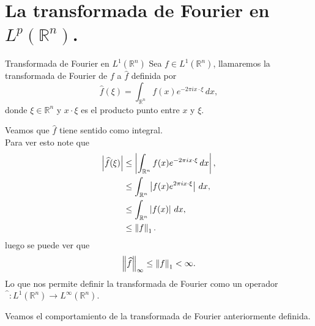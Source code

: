 \section{La transformada de Fourier en $L^{p}(\mathbb{R}^{n})$.}
  \begin{definition}{Transformada de Fourier en $L^{1}(\mathbb{R}^{n})$}
    Sea $f\in L^{1}(\mathbb{R}^{n})$, llamaremos la transformada de Fourier de $f$ a $\hat{f}$ definida por
    \begin{equation}
      \hat{f}(\xi)=\int_{\mathbb{R}^{n}}f(x)e^{-2\pi i x\cdot \xi}\,dx,
    \end{equation}
    donde $\xi\in\mathbb{R}^{n}$ y $x\cdot\xi$ es el producto punto entre $x$ y $\xi$. 
  \end{definition}
  \begin{note}{}
    Veamos que $\hat{f}$ tiene sentido como integral.\\
    Para ver esto note que
    \begin{align*}
      \left| \widehat{f}(\xi) \right|&\leq\left| \int_{\mathbb{R}^{n}}f(x)e^{-2\pi ix\cdot\xi}\,dx \right|,\\
      &\leq \int_{\mathbb{R}^{n}}\left| f(x)e^{2\pi ix\cdot\xi} \right|\,dx,\\
      &\leq \int_{\mathbb{R}^{n}}\left| f(x) \right|\,dx,\\
      &\leq \left\lVert f\right\rVert_{1}.
    \end{align*}
    luego se puede ver que
    \begin{align*}
      \left\lVert\widehat{f}\right\rVert_{\infty}\leq \left\lVert f\right\rVert_{1}<\infty.
    \end{align*}
    Lo que nos permite definir la transformada de Fourier como un operador $\hat{\phantom{f}}:L^{1}(\mathbb{R}^{n})\to L^{\infty}(\mathbb{R}^{n})$.
  \end{note}
  Veamos el comportamiento de la transformada de Fourier anteriormente definida.
